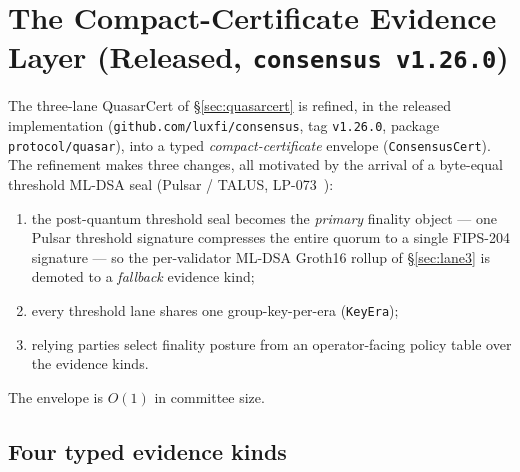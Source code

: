 \section{The Compact-Certificate Evidence Layer (Released, \texttt{consensus v1.26.0})}
\label{sec:compact-cert}

The three-lane QuasarCert of \S\ref{sec:quasarcert} is refined, in the
released implementation (\texttt{github.com/luxfi/consensus}, tag
\texttt{v1.26.0}, package \texttt{protocol/quasar}), into a typed
\emph{compact-certificate} envelope (\texttt{ConsensusCert}). The refinement
makes three changes, all motivated by the arrival of a byte-equal threshold
ML-DSA seal (Pulsar / TALUS, LP-073~\cite{lp073}):
\begin{enumerate}[leftmargin=2em,nosep]
  \item the post-quantum threshold seal becomes the \emph{primary} finality
        object --- one Pulsar threshold signature compresses the entire
        quorum to a single FIPS-204 signature --- so the per-validator
        ML-DSA Groth16 rollup of \S\ref{sec:lane3} is demoted to a
        \emph{fallback} evidence kind;
  \item every threshold lane shares one group-key-per-era (\texttt{KeyEra});
  \item relying parties select finality posture from an operator-facing
        policy table over the evidence kinds.
\end{enumerate}
The envelope is $O(1)$ in committee size.

\subsection{Four typed evidence kinds}
\label{sec:compact-cert:kinds}

